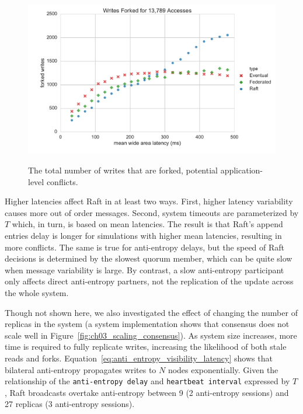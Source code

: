 \begin{figure}
    \begin{center}
        \includegraphics[width=5in]{figures/ch04_latency_forked_writes.pdf}
    \end{center}
    \renewcommand{\baselinestretch}{1}
    \small\normalsize

    \begin{quote}
        \caption[Latency Simulation Forked Writes]{The total number of writes that are forked, potential application-level conflicts.}
        \label{fig:ch04_latency_forked_writes}
    \end{quote}
\end{figure}
\renewcommand{\baselinestretch}{2}
\small\normalsize

Higher latencies affect Raft in at least two ways.
First, higher latency variability causes more out of order messages.
Second, system timeouts are parameterized by $T$ which, in turn, is based on mean latencies.
The result is that Raft's append entries delay is longer for simulations with higher mean latencies, resulting in more conflicts.
The same is true for anti-entropy delays, but the speed of Raft decisions is determined by the slowest quorum member, which can be quite slow when message variability is large.
By contrast, a slow anti-entropy participant only affects direct anti-entropy partners, not the replication of the update across the whole system.

Though not shown here, we also investigated the effect of changing the number of replicas in the system (a system implementation shows that consensus does not scale well in Figure~\ref{fig:ch03_scaling_consensus}).
As system size increases, more time is required to fully replicate writes, increasing the likelihood of both stale reads and forks.
Equation~\ref{eq:anti_entropy_visibility_latency} shows that bilateral anti-entropy propagates writes to $N$ nodes exponentially.
Given the relationship of the \texttt{anti-entropy delay} and \texttt{heartbeat interval} expressed by $T$, Raft broadcasts overtake anti-entropy between 9 (2 anti-entropy sessions) and 27 replicas (3 anti-entropy sessions).

